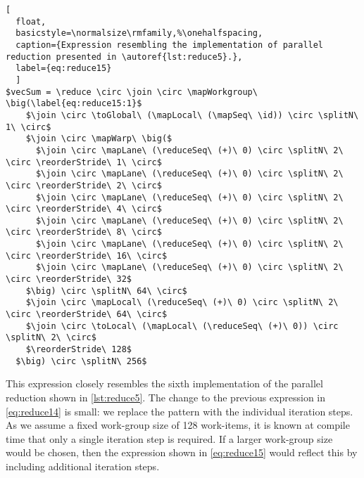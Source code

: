 \begin{lstlisting}[
  float,
  basicstyle=\normalsize\rmfamily,%\onehalfspacing,
  caption={Expression resembling the implementation of parallel reduction presented in \autoref{lst:reduce5}.},
  label={eq:reduce15}
  ]
$vecSum = \reduce \circ \join \circ \mapWorkgroup\ \big(\label{eq:reduce15:1}$
    $\join \circ \toGlobal\ (\mapLocal\ (\mapSeq\ \id)) \circ \splitN\ 1\ \circ$
    $\join \circ \mapWarp\ \big($
      $\join \circ \mapLane\ (\reduceSeq\ (+)\ 0) \circ \splitN\ 2\ \circ \reorderStride\ 1\ \circ$
      $\join \circ \mapLane\ (\reduceSeq\ (+)\ 0) \circ \splitN\ 2\ \circ \reorderStride\ 2\ \circ$
      $\join \circ \mapLane\ (\reduceSeq\ (+)\ 0) \circ \splitN\ 2\ \circ \reorderStride\ 4\ \circ$
      $\join \circ \mapLane\ (\reduceSeq\ (+)\ 0) \circ \splitN\ 2\ \circ \reorderStride\ 8\ \circ$
      $\join \circ \mapLane\ (\reduceSeq\ (+)\ 0) \circ \splitN\ 2\ \circ \reorderStride\ 16\ \circ$
      $\join \circ \mapLane\ (\reduceSeq\ (+)\ 0) \circ \splitN\ 2\ \circ \reorderStride\ 32$
    $\big) \circ \splitN\ 64\ \circ$
    $\join \circ \mapLocal\ (\reduceSeq\ (+)\ 0) \circ \splitN\ 2\ \circ \reorderStride\ 64\ \circ$
    $\join \circ \toLocal\ (\mapLocal\ (\reduceSeq\ (+)\ 0)) \circ \splitN\ 2\ \circ$
    $\reorderStride\ 128$
  $\big) \circ \splitN\ 256$
\end{lstlisting}
%
This expression closely resembles the sixth implementation of the parallel reduction shown in \autoref{lst:reduce5}.
The change to the previous expression in \autoref{eq:reduce14} is small:
we replace the \iterateN pattern with the individual iteration steps.
As we assume a fixed work-group size of 128 work-items, it is known at compile time that only a single iteration step is required.
If a larger work-group size would be chosen, then the expression shown in \autoref{eq:reduce15} would reflect this by including additional iteration steps.





